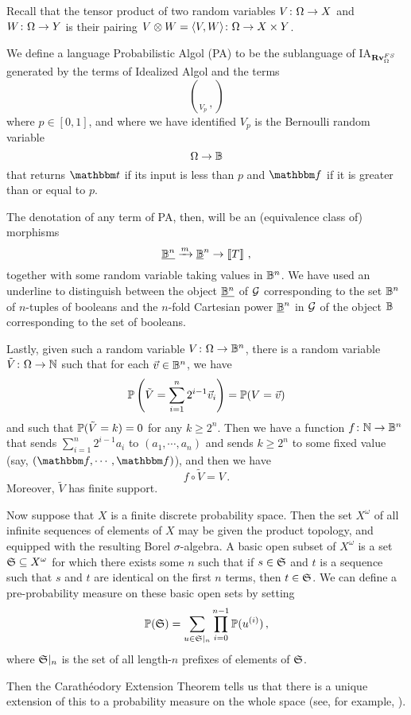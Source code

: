 Recall that the tensor product of two random variables $V\from \Omega \to X$ and $W \from \Omega \to Y$ is their pairing $V \tensor W = \langle V,W\rangle \from \Omega \to X \times Y$.

We define a language Probabilistic Algol (PA) to be the sublanguage of IA${}_{\Rv_\Omega^{FS}}$ generated by the terms of Idealized Algol and the terms
\[
  \choose_{V_p}\,,
  \]
where $p\in [0,1]$, and where we have identified $V_p$ is the Bernoulli random variable
\[
  \Omega \to \bB
  \]
that returns $\true$ if its input is less than $p$ and $\false$ if it is greater than or equal to $p$.

The denotation of any term of PA, then, will be an (equivalence class of) morphisms
\[
  \ul{\bB^n} \xrightarrow{m} \ul{\bB}^n \to \deno{T}\,,
  \]
together with some random variable taking values in $\bB^n$.
We have used an underline to distinguish between the object $\ul{\bB^n}$ of $\G$ corresponding to the set $\bB^n$ of $n$-tuples of booleans and the $n$-fold Cartesian power $\ul{\bB}^n$ in $\G$ of the object $\bB$ corresponding to the set of booleans.

Lastly, given such a random variable $V\from\Omega \to \bB^n$, there is a random variable $\tilde{V} \from \Omega \to \bN$ such that for each $\vec{v}\in\bB^n$, we have
\[
  \bP\left(\tilde{V} = \sum_{i=1}^n 2^{i-1}\vec{v}_i\right) = \bP(V = \vec{v})
  \]
and such that $\bP(\tilde{V}=k)=0$ for any $k\ge 2^n$.
Then we have a function $f \from \bN \to \bB^n$ that sends $\sum_{i=1}^n 2^{i-1}a_i$ to $(a_1,\cdots,a_n)$ and sends $k\ge 2^n$ to some fixed value (say, $(\false,\cdots,\false)$), and then we have
\[
  f\circ\tilde{V}=V\,.
  \]
Moreover, $\tilde{V}$ has finite support.

Now suppose that $X$ is a finite discrete probability space.  
Then the set $X^\omega$ of all infinite sequences of elements of $X$ may be given the product topology, and equipped with the resulting Borel $\sigma$-algebra.  
A basic open subset of $X^\omega$ is a set $\S\subset X^\omega$ for which there exists some $n$ such that if $s\in \S$ and $t$ is a sequence such that $s$ and $t$ are identical on the first $n$ terms, then $t\in\S$.
We can define a pre-probability measure on these basic open sets by setting
\[
  \bP(\S) = \sum_{u\in \S\vert_n} \prod_{i=0}^{n-1} \bP(u^{(i)})\,,
  \]
where $\S\vert_n$ is the set of all length-$n$ prefixes of elements of $\S$.

Then the Carath\'{e}odory Extension Theorem tells us that there is a unique extension of this to a probability measure on the whole space (see, for example, \cite[1.1.4]{StochasticCalculusII}).

